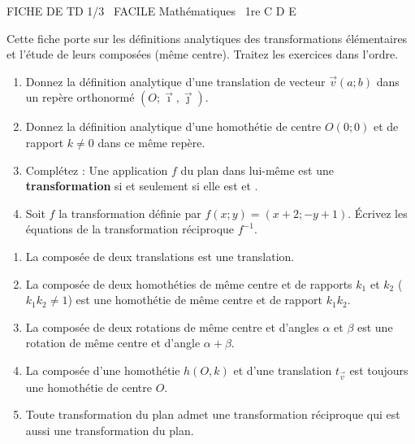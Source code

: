 \documentclass[11pt]{article}
\begin{document}
\begin{tcolorbox}[enhanced,colback=popink,colframe=popink,arc=10pt,boxrule=0pt,left=12pt,right=12pt,top=9pt,bottom=9pt]
{\color{white}\popxbold\small FICHE DE TD 1/3 \textbullet\ FACILE \hfill Mathématiques \textbullet\ 1re C D E\par}
\end{tcolorbox}
\vspace{4pt}
\noindent Cette fiche porte sur les définitions analytiques des transformations élémentaires et l'étude de leurs composées (même centre). Traitez les exercices dans l'ordre.

\begin{exercice}
\begin{enumerate}
    \item Donnez la définition analytique d'une translation de vecteur $\vec{v}(a;b)$ dans un repère orthonormé $(O;\vec{\imath},\vec{\jmath})$.
    \item Donnez la définition analytique d'une homothétie de centre $O(0;0)$ et de rapport $k \neq 0$ dans ce même repère.
    \item Complétez : Une application $f$ du plan dans lui-même est une \textbf{transformation} si et seulement si elle est \underline{\hspace{4cm}} et \underline{\hspace{4cm}}.
    \item Soit $f$ la transformation définie par $f(x;y) = (x+2; -y+1)$. Écrivez les équations de la transformation réciproque $f^{-1}$.
\end{enumerate}
\end{exercice}

\begin{exercice}
\begin{enumerate}
    \item La composée de deux translations est une translation.
    \item La composée de deux homothéties de même centre et de rapports $k_1$ et $k_2$ ($k_1k_2 \neq 1$) est une homothétie de même centre et de rapport $k_1k_2$.
    \item La composée de deux rotations de même centre et d'angles $\alpha$ et $\beta$ est une rotation de même centre et d'angle $\alpha + \beta$.
    \item La composée d'une homothétie $h(O,k)$ et d'une translation $t_{\vec{v}}$ est toujours une homothétie de centre $O$.
    \item Toute transformation du plan admet une transformation réciproque qui est aussi une transformation du plan.
\end{enumerate}
\end{exercice}
\end{document}
